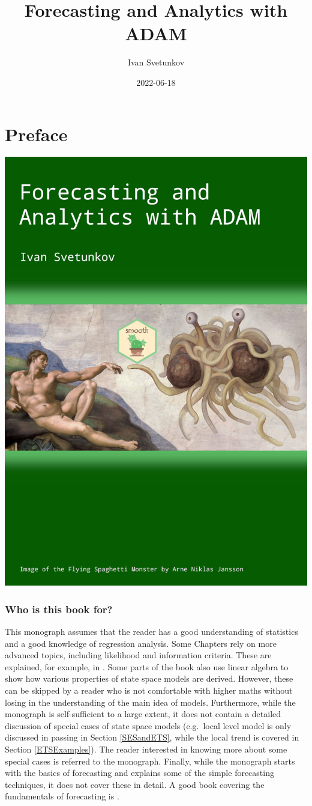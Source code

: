 \documentclass[
]{book}
\title{Forecasting and Analytics with ADAM}
\author{Ivan Svetunkov}
\date{2022-06-18}
\theoremstyle{definition}
\theoremstyle{definition}
\theoremstyle{definition}
\theoremstyle{definition}
\theoremstyle{remark}
\begin{document}
\maketitle

{
\setcounter{tocdepth}{1}
\tableofcontents
}
\hypertarget{preface}{%
\chapter*{Preface}\label{preface}}

\begin{center}\includegraphics[width=0.6\linewidth]{images/Adam-Title-web} \end{center}

\hypertarget{who-is-this-book-for}{%
\subsection*{Who is this book for?}\label{who-is-this-book-for}}

This monograph assumes that the reader has a good understanding of statistics and a good knowledge of regression analysis. Some Chapters rely on more advanced topics, including likelihood and information criteria. These are explained, for example, in \citet{SvetunkovSBA}. Some parts of the book also use linear algebra to show how various properties of state space models are derived. However, these can be skipped by a reader who is not comfortable with higher maths without losing in the understanding of the main idea of models. Furthermore, while the monograph is self-sufficient to a large extent, it does not contain a detailed discussion of special cases of state space models (e.g.~local level model is only discussed in passing in Section \ref{SESandETS}, while the local trend is covered in Section \ref{ETSExamples}). The reader interested in knowing more about some special cases is referred to the \citet{Hyndman2008b} monograph. Finally, while the monograph starts with the basics of forecasting and explains some of the simple forecasting techniques, it does not cover these in detail. A good book covering the fundamentals of forecasting is \citet{Ord2017}.
\end{document}
